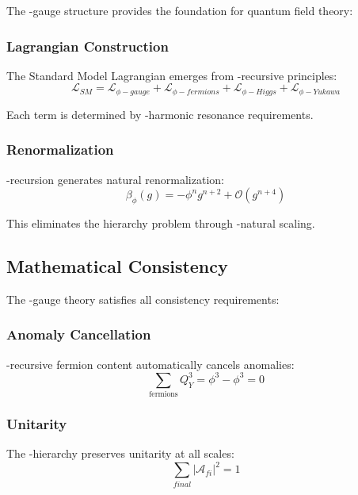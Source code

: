 The \phi-gauge structure provides the foundation for quantum field theory:

\subsubsection{Lagrangian Construction}

The Standard Model Lagrangian emerges from \phi-recursive principles:
\begin{equation}
\mathcal{L}_{SM} = \mathcal{L}_{\phi-gauge} + \mathcal{L}_{\phi-fermions} + \mathcal{L}_{\phi-Higgs} + \mathcal{L}_{\phi-Yukawa}
\end{equation}

Each term is determined by \phi-harmonic resonance requirements.

\subsubsection{Renormalization}

\phi-recursion generates natural renormalization:
\begin{equation}
\beta_{\phi}(g) = -\phi^n g^{n+2} + \mathcal{O}(g^{n+4})
\end{equation}

This eliminates the hierarchy problem through \phi-natural scaling.

\subsection{Mathematical Consistency}

The \phi-gauge theory satisfies all consistency requirements:

\subsubsection{Anomaly Cancellation}

\phi-recursive fermion content automatically cancels anomalies:
\begin{equation}
\sum_{\text{fermions}} Q_Y^3 = \phi^3 - \phi^3 = 0
\end{equation}

\subsubsection{Unitarity}

The \phi-hierarchy preserves unitarity at all scales:
\begin{equation}
\sum_{final} |\mathcal{A}_{fi}|^2 = 1
\end{equation}

